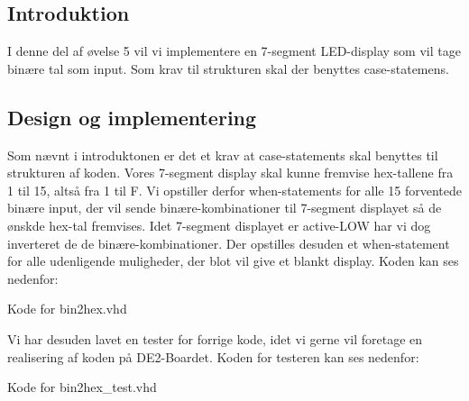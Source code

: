 \documentclass[../journal.tex]{subfiles}
\begin{document}
\subsection{Introduktion}
I denne del af øvelse 5 vil vi implementere en 7-segment LED-display som vil tage binære tal som input. Som krav til strukturen skal der benyttes case-statemens.

\subsection{Design og implementering}
Som nævnt i introduktonen er det et krav at case-statements skal benyttes til strukturen af koden. Vores 7-segment display skal kunne fremvise hex-tallene fra 1 til 15, altså fra 1 til F. Vi opstiller derfor when-statements for alle 15 forventede binære input, der vil sende binære-kombinationer til 7-segment displayet så de ønskde hex-tal fremvises. Idet 7-segment displayet er active-LOW har vi dog inverteret de de binære-kombinationer. Der opstilles desuden et when-statement for alle udenligende muligheder, der blot vil give et blankt display. Koden kan ses nedenfor:

\begin{table}[H]
    \centering
      \framebox{
        \rule{8pt}{0pt}
          
  }
  \caption{Kode for bin2hex.vhd}	
\end{table}

Vi har desuden lavet en tester for forrige kode, idet vi gerne vil foretage en realisering af koden på DE2-Boardet. Koden for testeren kan ses nedenfor:

\begin{table}[H]
    \centering
      \framebox{
        \rule{8pt}{0pt}
          
  }
  \caption{Kode for bin2hex\_test.vhd}	
\end{table}

%          

%            
\end{document}
